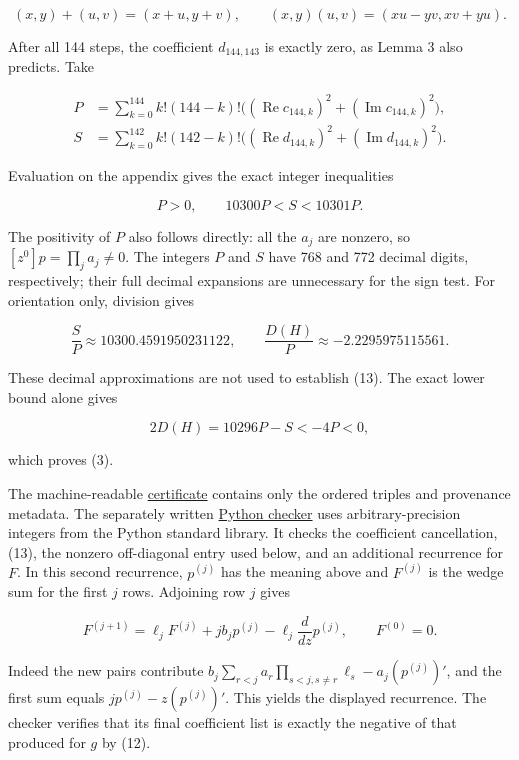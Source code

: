 \documentclass[10pt,a4paper]{article}
\begin{document}
\nopagebreak[4]
\[
(x,y)+(u,v)=(x+u,y+v),\qquad
(x,y)(u,v)=(xu-yv,xv+yu).
\]

After all 144 steps, the coefficient \(d_{144,143}\) is exactly zero, as
Lemma 3 also predicts. Take

\nopagebreak[4]
\[
\begin{aligned}
P&=\sum_{k=0}^{144}k!(144-k)!
       \big((\operatorname{Re}c_{144,k})^2+(\operatorname{Im}c_{144,k})^2\big),\\
S&=\sum_{k=0}^{142}k!(142-k)!
       \big((\operatorname{Re}d_{144,k})^2+(\operatorname{Im}d_{144,k})^2\big).
\end{aligned}
\]

Evaluation on the appendix gives the exact integer inequalities

\nopagebreak[4]
\[
P>0,\qquad 10300P<S<10301P.
\tag{13}
\]

The positivity of \(P\) also follows directly: all the \(a_j\) are
nonzero, so \([z^0]p=\prod_j a_j\ne0\). The integers \(P\) and \(S\)
have 768 and 772 decimal digits, respectively; their full decimal
expansions are unnecessary for the sign test. For orientation only,
division gives

\nopagebreak[4]
\[
\frac SP\approx10300.4591950231122,\qquad
\frac{D(H)}P\approx-2.2295975115561.
\]

These decimal approximations are not used to establish (13). The exact
lower bound alone gives

\nopagebreak[4]
\[
2D(H)=10296P-S<-4P<0,
\]

which proves (3).

The machine-readable
\href{https://github.com/ajt60gaibb/OpenProblemsInNLA/blob/main/matrix-inequalities-and-norms/MI-18/certificate.json}{certificate}
contains only the ordered triples and provenance metadata. The
separately written
\href{https://github.com/ajt60gaibb/OpenProblemsInNLA/blob/main/matrix-inequalities-and-norms/MI-18/verify_certificate.py}{Python
checker} uses arbitrary-precision integers from the Python standard
library. It checks the coefficient cancellation, (13), the nonzero
off-diagonal entry used below, and an additional recurrence for \(F\).
In this second recurrence, \(p^{(j)}\) has the meaning above and
\(F^{(j)}\) is the wedge sum for the first \(j\) rows. Adjoining row
\(j\) gives

\nopagebreak[4]
\[
F^{(j+1)}
=\ell_jF^{(j)}+j b_jp^{(j)}-\ell_j\frac{d}{dz}p^{(j)},
\qquad F^{(0)}=0.
\]

Indeed the new pairs contribute
\(b_j\sum_{r<j}a_r\prod_{s<j,s\ne r}\ell_s-a_j(p^{(j)})'\), and the
first sum equals \(j p^{(j)}-z(p^{(j)})'\). This yields the displayed
recurrence. The checker verifies that its final coefficient list is
exactly the negative of that produced for \(g\) by (12).
\end{document}
